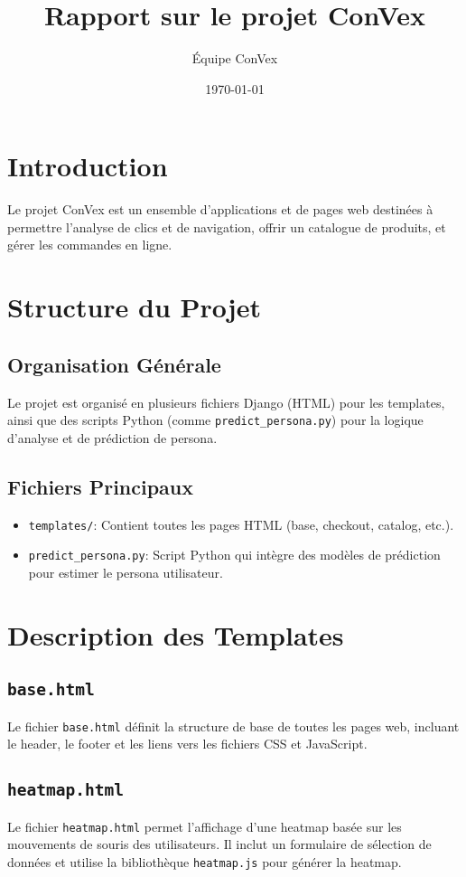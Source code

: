 \documentclass[12pt,a4paper]{article}
\title{Rapport sur le projet ConVex}
\author{Équipe ConVex}
\date{\today}
\begin{document}
\maketitle

\tableofcontents
\clearpage

\section{Introduction}
Le projet ConVex est un ensemble d'applications et de pages web destinées à permettre l'analyse de clics et de navigation, offrir un catalogue de produits, et gérer les commandes en ligne.

\section{Structure du Projet}
\subsection{Organisation Générale}
Le projet est organisé en plusieurs fichiers Django (HTML) pour les templates, ainsi que des scripts Python (comme \texttt{predict\_persona.py}) pour la logique d'analyse et de prédiction de persona.

\subsection{Fichiers Principaux}
\begin{itemize}
  \item \texttt{templates/}: Contient toutes les pages HTML (base, checkout, catalog, etc.).
  \item \texttt{predict\_persona.py}: Script Python qui intègre des modèles de prédiction pour estimer le persona utilisateur.
\end{itemize}

\section{Description des Templates}
\subsection{\texttt{base.html}}
Le fichier \texttt{base.html} définit la structure de base de toutes les pages web, incluant le header, le footer et les liens vers les fichiers CSS et JavaScript.

\subsection{\texttt{heatmap.html}}
Le fichier \texttt{heatmap.html} permet l'affichage d'une heatmap basée sur les mouvements de souris des utilisateurs. Il inclut un formulaire de sélection de données et utilise la bibliothèque \texttt{heatmap.js} pour générer la heatmap.
\end{document}
